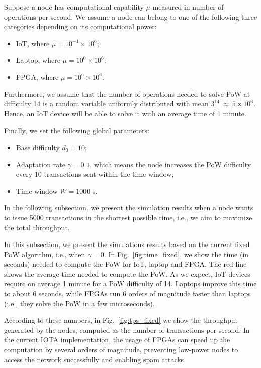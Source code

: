 \documentclass[../main.tex]{subfiles}
\begin{document}
Suppose a node has computational capability $\mu$ measured in number of operations per second. We assume a node can belong to one of the following three categories depending on its computational power:
\begin{itemize}
    \item IoT, where $\mu = 10^{-1}\times 10^6$;
    \item Laptop, where $\mu = 10^{0}\times 10^6$;
    \item FPGA, where $\mu = 10^{6}\times 10^6$.
\end{itemize}

Furthermore, we assume that the number of operations needed to solve PoW at difficulty 14 is a random variable uniformly distributed with mean $3^{14}~\approx~5\times 10^{6}$. Hence, an IoT device will be able to solve it with an average time of 1 minute.

Finally, we set the following global parameters:
\begin{itemize}
    \item Base difficulty $d_0 = 10$;
    \item Adaptation rate $\gamma = 0.1$, which means the node increases the PoW difficulty every 10 transactions sent within the time window;
    \item Time window $W = 1000$ s.
\end{itemize}
 
In the following subsection, we present the simulation results when a node wants to issue 5000 transactions in the shortest possible time, i.e., we aim to maximize the total throughput.

In this subsection, we present the simulations results based on the current fixed PoW algorithm, i.e., when $\gamma = 0$. In Fig.~\ref{fig:time_fixed}, we show the time (in seconds) needed to compute the PoW for IoT, laptop and FPGA. The red line shows the average time needed to compute the PoW. As we expect, IoT devices require on average 1 minute for a PoW difficulty of 14. Laptops improve this time to about 6 seconds, while FPGAs run 6 orders of magnitude faster than laptops (i.e., they solve the PoW in a few microseconds).

According to these numbers, in Fig.~\ref{fig:tps_fixed} we show the throughput generated by the nodes, computed as the number of transactions per second. In the current IOTA implementation, the usage of FPGAs can speed up the computation by several orders of magnitude, preventing low-power nodes to access the network successfully and enabling spam attacks.
\end{document}
